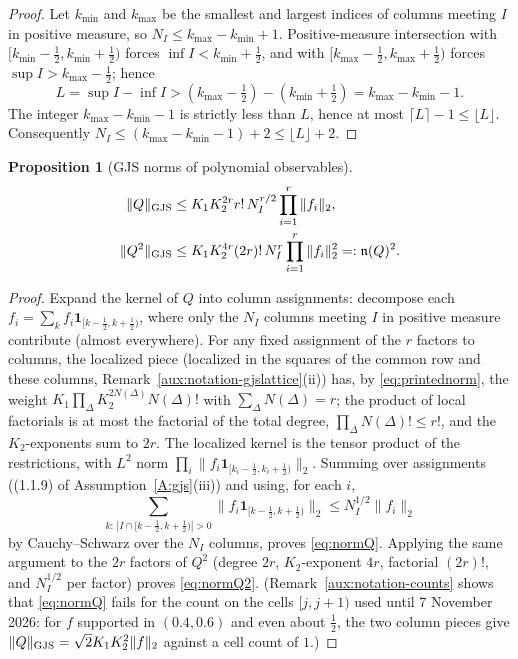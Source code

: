 \documentclass[11pt,a4paper]{article}
\theoremstyle{plain}
\newtheorem{proposition}[theorem]{Proposition}
\theoremstyle{definition}
\theoremstyle{plain}
\theoremstyle{definition}
\begin{document}
\begin{proof}
Let $k_{\min}$ and $k_{\max}$ be the smallest and largest indices of columns meeting $I$ in
positive measure, so $N_I\le k_{\max}-k_{\min}+1$. Positive-measure intersection with
$[k_{\min}-\frac12,k_{\min}+\frac12)$ forces $\inf I<k_{\min}+\frac12$, and with
$[k_{\max}-\frac12,k_{\max}+\frac12)$ forces $\sup I>k_{\max}-\frac12$; hence
\[
 L=\sup I-\inf I>(k_{\max}-\tfrac12)-(k_{\min}+\tfrac12)=k_{\max}-k_{\min}-1 .
\]
The integer $k_{\max}-k_{\min}-1$ is strictly less than $L$, hence at most
$\lceil L\rceil-1\le\lfloor L\rfloor$. Consequently
$N_I\le(k_{\max}-k_{\min}-1)+2\le\lfloor L\rfloor+2$.
\end{proof}

\begin{proposition}[GJS norms of polynomial observables]\label{prop:gjsnorms}
\begin{align}
 \|Q\|_{\rm GJS}
 &\le K_1K_2^{2r}r!\,N_I^{r/2}\prod_{i=1}^r\|f_i\|_2,\label{eq:normQ}\\
 \|Q^2\|_{\rm GJS}
 &\le K_1K_2^{4r}(2r)!\,N_I^{r}\prod_{i=1}^r\|f_i\|_2^2
   =:\mathfrak n(Q)^2 .\label{eq:normQ2}
\end{align}
\end{proposition}

\begin{proof}
Expand the kernel of $Q$ into column assignments: decompose each
$f_i=\sum_k f_i\mathbf 1_{[k-\frac12,k+\frac12)}$, where only the $N_I$ columns meeting $I$
in positive measure contribute (almost everywhere). For any fixed assignment of the $r$
factors to columns, the localized piece (localized in the squares of the common row and
these columns, Remark~\ref{aux:notation-gjslattice}(ii)) has, by \eqref{eq:printednorm}, the
weight $K_1\prod_\Delta K_2^{2N(\Delta)}N(\Delta)!$ with $\sum_\Delta N(\Delta)=r$; the
product of local factorials is at most the factorial of the total degree, $\prod_\Delta
N(\Delta)!\le r!$, and the $K_2$-exponents sum to $2r$. The localized kernel is the tensor
product of the restrictions, with $L^2$ norm
$\prod_i\|f_i\mathbf 1_{[k_i-\frac12,k_i+\frac12)}\|_2$.
Summing over assignments ((1.1.9) of Assumption~\ref{A:gjs}(iii)) and using, for each $i$,
\[
 \sum_{k:\,|I\cap[k-\frac12,k+\frac12)|>0}\|f_i\mathbf 1_{[k-\frac12,k+\frac12)}\|_2
 \le N_I^{1/2}\|f_i\|_2
\]
by Cauchy--Schwarz over the $N_I$ columns, proves \eqref{eq:normQ}. Applying the same
argument to the $2r$ factors of $Q^2$ (degree $2r$, $K_2$-exponent $4r$, factorial
$(2r)!$, and $N_I^{1/2}$ per factor) proves \eqref{eq:normQ2}.  (Remark~\ref{aux:notation-counts}
shows that \eqref{eq:normQ} fails for the count on the cells $[j,j+1)$ used until
7 November 2026: for $f$ supported in $(0.4,0.6)$ and even about $\frac12$, the two column
pieces give $\|Q\|_{\rm GJS}=\sqrt2K_1K_2^2\|f\|_2$ against a cell count of $1$.)
\end{proof}
\end{document}
